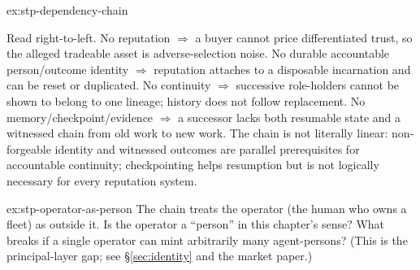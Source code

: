 \documentclass[11pt,a4paper]{article}
\theoremstyle{definition}
\begin{document}
\begin{pdsolution}{ex:stp-dependency-chain}
\par\smallskip
\begin{center}
%
\end{center}
\par\smallskip
Read right-to-left. No reputation $\Rightarrow$ a buyer cannot price
differentiated trust, so the alleged tradeable asset is adverse-selection
noise. No durable accountable person/outcome identity $\Rightarrow$ reputation
attaches to a disposable incarnation and can be reset or duplicated. No
continuity $\Rightarrow$ successive role-holders cannot be shown to belong to
one lineage; history does not follow replacement. No memory/checkpoint/evidence
$\Rightarrow$ a successor lacks both resumable state and a witnessed chain from
old work to new work. The chain is not literally linear: non-forgeable identity
and witnessed outcomes are parallel prerequisites for accountable continuity;
checkpointing helps resumption but is not logically necessary for every
reputation system.
\end{pdsolution}
\begin{pdexercise}[kind=Open,rating=3]{ex:stp-operator-as-person}
The chain treats the operator (the human who owns a fleet) as outside it. Is
the operator a ``person'' in this chapter's sense? What breaks if a single
operator can mint arbitrarily many agent-persons? (This is the principal-layer
gap; see \S\ref{sec:identity} and the market paper.)
\end{pdexercise}
\end{document}
